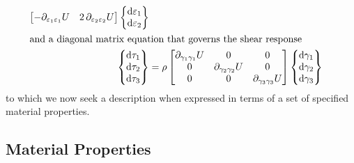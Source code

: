 \begin{subequations}
\begin{align}
\begin{bmatrix}
    - \partial_{\varepsilon_1 \varepsilon_1} U & 2 \, \partial_{\varepsilon_2 \varepsilon_2} U 
    \end{bmatrix}
    \left\{ \begin{matrix}
    \mathrm{d} \varepsilon_1 \\ \mathrm{d} \varepsilon_2 
    \end{matrix} \right\} \\
    \intertext{and a diagonal matrix equation that governs the shear response}
    \left\{ \begin{matrix} 
    \mathrm{d} \tau_1 \\ \mathrm{d} \tau_2 \\ \mathrm{d} \tau_3
    \end{matrix} \right\} & = \rho \begin{bmatrix}
    \partial_{\gamma_1\gamma_1} U & 0 & 0 \\
    0 & \partial_{\gamma_2\gamma_2} U & 0 \\
    0 & 0 & \partial_{\gamma_3\gamma_3} U
    \end{bmatrix}
    \left\{ \begin{matrix}
    \mathrm{d} \gamma_1 \\ \mathrm{d} \gamma_2 \\ \mathrm{d} \gamma_3
    \end{matrix} \right\}
    \end{align}
\end{subequations}
to which we now seek a description when expressed in terms of a set of specified material properties.

\subsection{Material Properties}
\label{secMaterialConstants3D}

